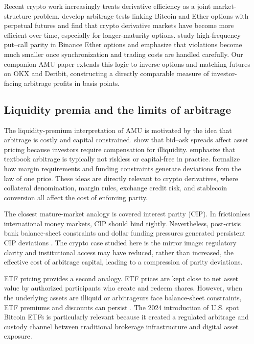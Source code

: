\documentclass[12pt]{article}
\begin{document}
Recent crypto work increasingly treats derivative efficiency as a joint market-structure problem. \citet{alexander2024arbitrage} develop arbitrage tests linking Bitcoin and Ether options with perpetual futures and find that crypto derivative markets have become more efficient over time, especially for longer-maturity options. \citet{felfoldi2024put} study high-frequency put--call parity in Binance Ether options and emphasize that violations become much smaller once synchronization and trading costs are handled carefully. Our companion AMU paper extends this logic to inverse options and matching futures on OKX and Deribit, constructing a directly comparable measure of investor-facing arbitrage profits in basis points.

\subsection{Liquidity premia and the limits of arbitrage}

The liquidity-premium interpretation of AMU is motivated by the idea that arbitrage is costly and capital constrained. \citet{amihud1986asset} show that bid--ask spreads affect asset pricing because investors require compensation for illiquidity. \citet{shleifer1997limits} emphasize that textbook arbitrage is typically not riskless or capital-free in practice. \citet{garleanu2011margin} formalize how margin requirements and funding constraints generate deviations from the law of one price. These ideas are directly relevant to crypto derivatives, where collateral denomination, margin rules, exchange credit risk, and stablecoin conversion all affect the cost of enforcing parity.

The closest mature-market analogy is covered interest parity (CIP). In frictionless international money markets, CIP should bind tightly. Nevertheless, post-crisis bank balance-sheet constraints and dollar funding pressures generated persistent CIP deviations \citep{du2018deviations}. The crypto case studied here is the mirror image: regulatory clarity and institutional access may have reduced, rather than increased, the effective cost of arbitrage capital, leading to a compression of parity deviations.

ETF pricing provides a second analogy. ETF prices are kept close to net asset value by authorized participants who create and redeem shares. However, when the underlying assets are illiquid or arbitrageurs face balance-sheet constraints, ETF premiums and discounts can persist \citep{pan2017etf, todorov2021bond}. The 2024 introduction of U.S. spot Bitcoin ETFs is particularly relevant because it created a regulated arbitrage and custody channel between traditional brokerage infrastructure and digital asset exposure.
\end{document}
